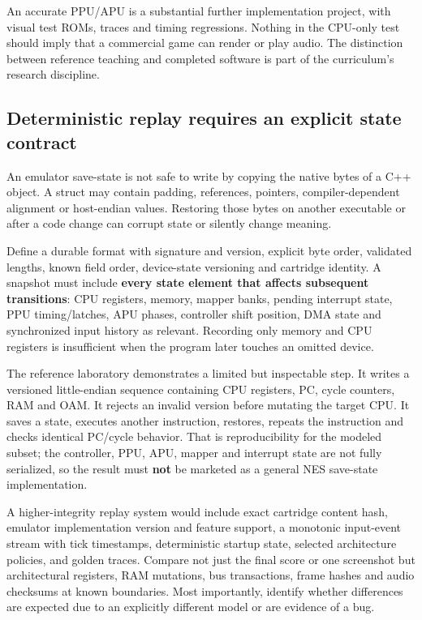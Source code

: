 An accurate PPU/APU is a substantial further implementation project, with visual test ROMs, traces and timing regressions. Nothing in the CPU-only test should imply that a commercial game can render or play audio. The distinction between reference teaching and completed software is part of the curriculum's research discipline.

\subsection{Deterministic replay requires an explicit state contract}\label{deterministic-replay-requires-an-explicit-state-contract}

An emulator save-state is not safe to write by copying the native bytes of a C++ object. A struct may contain padding, references, pointers, compiler-dependent alignment or host-endian values. Restoring those bytes on another executable or after a code change can corrupt state or silently change meaning.

Define a durable format with signature and version, explicit byte order, validated lengths, known field order, device-state versioning and cartridge identity. A snapshot must include \textbf{every state element that affects subsequent transitions}: CPU registers, memory, mapper banks, pending interrupt state, PPU timing/latches, APU phases, controller shift position, DMA state and synchronized input history as relevant. Recording only memory and CPU registers is insufficient when the program later touches an omitted device.

The reference laboratory demonstrates a limited but inspectable step. It writes a versioned little-endian sequence containing CPU registers, PC, cycle counters, RAM and OAM. It rejects an invalid version before mutating the target CPU. It saves a state, executes another instruction, restores, repeats the instruction and checks identical PC/cycle behavior. That is reproducibility for the modeled subset; the controller, PPU, APU, mapper and interrupt state are not fully serialized, so the result must \textbf{not} be marketed as a general NES save-state implementation.

A higher-integrity replay system would include exact cartridge content hash, emulator implementation version and feature support, a monotonic input-event stream with tick timestamps, deterministic startup state, selected architecture policies, and golden traces. Compare not just the final score or one screenshot but architectural registers, RAM mutations, bus transactions, frame hashes and audio checksums at known boundaries. Most importantly, identify whether differences are expected due to an explicitly different model or are evidence of a bug.


